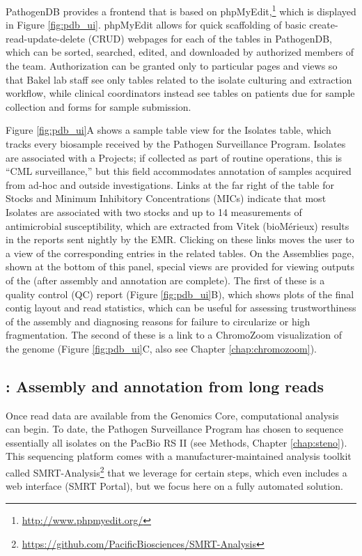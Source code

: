 PathogenDB provides a frontend that is based on phpMyEdit,\footnote{\url{http://www.phpmyedit.org/}} which is displayed in Figure \ref{fig:pdb_ui}. phpMyEdit allows for quick scaffolding of basic create-read-update-delete (CRUD) webpages for each of the tables in PathogenDB, which can be sorted, searched, edited, and downloaded by authorized members of the team. Authorization can be granted only to particular pages and views so that Bakel lab staff see only tables related to the isolate culturing and extraction workflow, while clinical coordinators instead see tables on patients due for sample collection and forms for sample submission.

Figure \ref{fig:pdb_ui}A shows a sample table view for the Isolates table, which tracks every biosample received by the Pathogen Surveillance Program. Isolates are associated with a Projects; if collected as part of routine operations, this is ``CML surveillance,'' but this field accommodates annotation of samples acquired from ad-hoc and outside investigations. Links at the far right of the table for Stocks and Minimum Inhibitory Concentrations (MICs) indicate that most Isolates are associated with two stocks and up to 14 measurements of antimicrobial susceptibility, which are extracted from Vitek (bioMérieux) results in the reports sent nightly by the EMR. Clicking on these links moves the user to a view of the corresponding entries in the related tables. On the Assemblies page, shown at the bottom of this panel, special views are provided for viewing outputs of the \pathogendbpipeline{} (after assembly and annotation are complete). The first of these is a quality control (QC) report (Figure \ref{fig:pdb_ui}B), which shows plots of the final contig layout and read statistics, which can be useful for assessing trustworthiness of the assembly and diagnosing reasons for failure to circularize or high fragmentation. The second of these is a link to a ChromoZoom visualization of the genome (Figure \ref{fig:pdb_ui}C, also see Chapter \ref{chap:chromozoom}).

\subsection{\pathogendbpipeline: Assembly and annotation from long reads}

Once read data are available from the Genomics Core, computational analysis can begin. To date, the Pathogen Surveillance Program has chosen to sequence essentially all isolates on the PacBio RS II (see Methods, Chapter \ref{chap:steno}). This sequencing platform comes with a manufacturer-maintained analysis toolkit called SMRT-Analysis\footnote[][-2.5cm]{\url{https://github.com/PacificBiosciences/SMRT-Analysis}} that we leverage for certain steps, which even includes a web interface (SMRT Portal), but we focus here on a fully automated solution.

